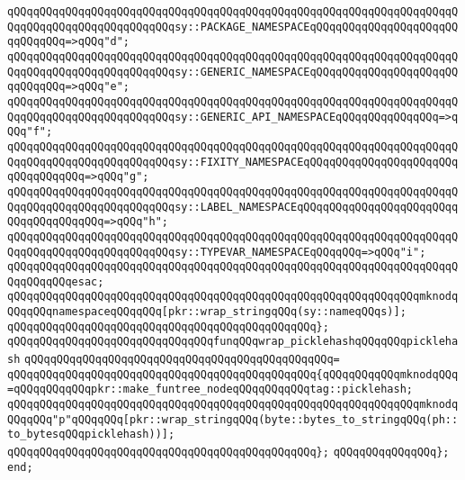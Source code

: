 \verb|qQQqqQQqqQQqqQQqqQQqqQQqqQQqqQQqqQQqqQQqqQQqqQQqqQQqqQQqqQQqqQQqqQQqqQQqqQQqqQQqqQQqqQQqqQQqqQQqsy::PACKAGE_NAMESPACEqQQqqQQqqQQqqQQqqQQqqQQqqQQqqQQq=>qQQq"d";|\newline
\verb|qQQqqQQqqQQqqQQqqQQqqQQqqQQqqQQqqQQqqQQqqQQqqQQqqQQqqQQqqQQqqQQqqQQqqQQqqQQqqQQqqQQqqQQqqQQqqQQqsy::GENERIC_NAMESPACEqQQqqQQqqQQqqQQqqQQqqQQqqQQqqQQq=>qQQq"e";|\newline
\verb|qQQqqQQqqQQqqQQqqQQqqQQqqQQqqQQqqQQqqQQqqQQqqQQqqQQqqQQqqQQqqQQqqQQqqQQqqQQqqQQqqQQqqQQqqQQqqQQqsy::GENERIC_API_NAMESPACEqQQqqQQqqQQqqQQq=>qQQq"f";|\newline
\verb|qQQqqQQqqQQqqQQqqQQqqQQqqQQqqQQqqQQqqQQqqQQqqQQqqQQqqQQqqQQqqQQqqQQqqQQqqQQqqQQqqQQqqQQqqQQqqQQqsy::FIXITY_NAMESPACEqQQqqQQqqQQqqQQqqQQqqQQqqQQqqQQqqQQq=>qQQq"g";|\newline
\verb|qQQqqQQqqQQqqQQqqQQqqQQqqQQqqQQqqQQqqQQqqQQqqQQqqQQqqQQqqQQqqQQqqQQqqQQqqQQqqQQqqQQqqQQqqQQqqQQqsy::LABEL_NAMESPACEqQQqqQQqqQQqqQQqqQQqqQQqqQQqqQQqqQQqqQQq=>qQQq"h";|\newline
\verb|qQQqqQQqqQQqqQQqqQQqqQQqqQQqqQQqqQQqqQQqqQQqqQQqqQQqqQQqqQQqqQQqqQQqqQQqqQQqqQQqqQQqqQQqqQQqqQQqsy::TYPEVAR_NAMESPACEqQQqqQQq=>qQQq"i";|\newline
\verb|qQQqqQQqqQQqqQQqqQQqqQQqqQQqqQQqqQQqqQQqqQQqqQQqqQQqqQQqqQQqqQQqqQQqqQQqqQQqqQQqesac;|\newline
\newline
\verb|qQQqqQQqqQQqqQQqqQQqqQQqqQQqqQQqqQQqqQQqqQQqqQQqqQQqqQQqqQQqqQQqmknodqQQqqQQqnamespaceqQQqqQQq[pkr::wrap_stringqQQq(sy::nameqQQqs)];|\newline
\verb|qQQqqQQqqQQqqQQqqQQqqQQqqQQqqQQqqQQqqQQqqQQqqQQq};|\newline
\newline
\newline
\newline
\verb|qQQqqQQqqQQqqQQqqQQqqQQqqQQqqQQqfunqQQqwrap_picklehashqQQqqQQqpicklehash|\newline
\verb|qQQqqQQqqQQqqQQqqQQqqQQqqQQqqQQqqQQqqQQqqQQqqQQq=|\newline
\verb|qQQqqQQqqQQqqQQqqQQqqQQqqQQqqQQqqQQqqQQqqQQqqQQq{qQQqqQQqqQQqmknodqQQq=qQQqqQQqqQQqpkr::make_funtree_nodeqQQqqQQqqQQqtag::picklehash;|\newline
\newline
\verb|qQQqqQQqqQQqqQQqqQQqqQQqqQQqqQQqqQQqqQQqqQQqqQQqqQQqqQQqqQQqqQQqmknodqQQqqQQq"p"qQQqqQQq[pkr::wrap_stringqQQq(byte::bytes_to_stringqQQq(ph::to_bytesqQQqpicklehash))];|\newline
\verb|qQQqqQQqqQQqqQQqqQQqqQQqqQQqqQQqqQQqqQQqqQQqqQQq};|\newline
\verb|qQQqqQQqqQQqqQQq};|\newline
\verb|end;|\newline

